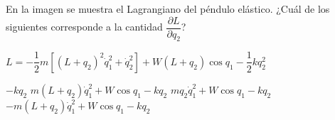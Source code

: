 \documentclass[12pt,addpoints]{exam}
\begin{document}
\begin{questions}
\question En la imagen se muestra el Lagrangiano del péndulo elástico. ¿Cuál de los siguientes corresponde a la cantidad $\dfrac{\partial L}{\partial q_2}$?
\begin{center}
$L = -\dfrac{1}{2} m \left[ (L + q_2)^2 \dot{q}_1^2 + \dot{q}_2^2 \right] + W (L + q_2) \cos q_1 - \dfrac{1}{2} k q_2^2$
\end{center}
\begin{choices}
\choice $-k q_2$
\choice $m (L + q_2) \dot{q}_1^2 + W \cos q_1 - k q_2$
\choice $m q_2 \dot{q}_1^2 + W \cos q_1 - k q_2$
\choice $-m (L + q_2) \dot{q}_1^2 + W \cos q_1 - k q_2$
\end{choices}

\end{questions}

\vspace{1.5cm}
\begin{center}
\end{center}
\end{document}
